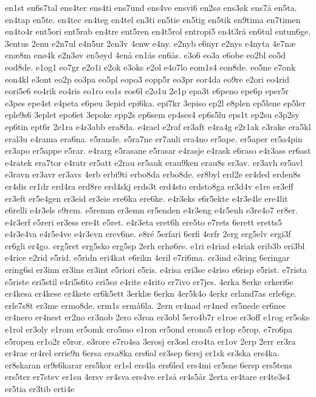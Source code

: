 en1st
en6s7tal
ens4ter
ens4ti
ens7und
ens4ve
ensvi6
en2s^^f8
ens3^^f8k
ens7^^e5
en5ta.
en4tap
en5te.
en4tec
en4teg
en4tel
en3ti
en5tie
en5tig
en5tik
en9tima
en7timen
en4to4r
ent5ori
ent5rab
en4tre
ent5ren
en4t5rol
entropi5
en4t3r^^e5
en6tul
entun6ge.
3entus
2enu
e2n7ul
e4n5ur
2en3v
4enw
e4ny.
e2nyb
e6nyr
e2nys
e4nyta
4e7n^^e6
en^^e68m
en^^f84k
e2n3^^f8v
en5^^f8yd
4en^^e5
en1^^e5s
en6^^e5s.
e3o6
eo3a
e6obe
eo2bl
eo5d
eod8de.
e1og1
eo7gr
e2o1i
e2ok
e3oks
e2ol
e4o7lo
eom1s4
eon8de.
eo5ne
e7onk
eon4kl
e3ont
eo2p
eo3pa
eo5pl
eopo3
eopp5r
eo3pr
eor4da
eo9re
e2ori
eo4rid
eori5e6
eo4rik
eo4ris
eo1ro
eo1s
eos6l
e2o1u
2e1p
epa3t
e6peno
epe6p
eper5r
e3pes
epe4st
e4peta
e6peu
3epid
epi6ka.
epi7kr
3episo
ep2l
e8plen
ep5lene
ep5ler
eple9s6
3eplet
epo6et
3epoke
epp2s
ep6sem
ep4ses4
ep6s5lu
eps1t
ep2su
e3p2sy
ep6tin
ept6r
2e1ra
e4r3abb
era8da.
e4rael
e2raf
er3aft
e4ra4g
e2r1ak
e3rake
era5kl
eral3u
e4rama
era6na.
e5rande.
e5ra7ne
er7anli
era4no
er5ape.
er5aper
er5a4pin
er3apo
er5appe
e5rar.
e4rarg
e5rasane
e5rasar
e4rasje
e4rask
e6raso
e4r3ass
er6ast
e4ratek
era7tor
e4ratr
er5att
e2rau
er5auk
erau9ken
erau8s
er3av.
er3avh
er5avl
e3ravn
er3avr
er3avs
4erb
erbi9ti
erbo8da
erbo8de.
er8byl
erd2e
er4ded
erden8s
er4dis
er1dr
erd4ra
erd8re
erd4skj
erds3t
erd4sto
erdsto8ga
er3d4v
e1re
er3eff
er3eft
er5e4gen
er3eid
er3eie
ere6ka
ere6ke.
e4r3eks
e6r5ekte
e4r3e4le
ere4lit
e6relli
e4r3els
e9rem.
e5remm
er3emn
er5enden
e4r3eng
e4r5enh
e3re4o7
er8er.
e4r3erf
e5reri
er3ess
ere4t
e5ret.
e4r3eta
eret6h
ere5to
e7rets
6erett
eretts5
e4r3e4va
e4r5e4ve
e4r3evn
erev6ne.
e8r^^e9
5erfari
6erfi
4erfr
2erg
erg5elv
ergi3f
er6gli
er4go.
erg5ret
erg5sko
erg5sp
2erh
erh^^f86re.
e1ri
e4riad
e4riak
erib3b
eri3bl
e4rice
e2rid
e5rid.
e5ridn
eri4kat
e6rikn
4eril
e7ri6ma.
er3ind
e3ring
6eringar
ering6si
er3inn
er3ins
er3int
e5riori
e5ris.
e4risa
eri3se
e4riso
e6risp
e5rist.
e7rista
e5riste
eri5stil
e4ri5s6to
eri5s^^f8
e4rite
e4rito
er7ivo
er7jes.
4erka
8erke
erkeri6e
er4kesa
er4kese
er4kete
er6k5ett
3erkl^^e6
6erkn
4er5k4o
4erkr
erland7as
erle6ge.
erle7s8t
er3me
ermo8de.
erm1s
erm^^e56la.
2ern
er4nad
er4ned
er5nede
er6nee
er4nero
er4nest
er2no
er3nob
2ero
e3roa
er3obl
5ero4b7r
e1roe
er3off
e1rog
er5oks
e1rol
er3oly
e1rom
er5omk
ero5mo
e1ron
er5ond
erono5
er1op
e5rop.
e7ro6pa
e5ropen
er1o2r
e5ror.
e3rore
e7ro4sa
3erosj
er3osl
ero4ta
er1ov
2erp
2err
er3ra
er4rae
er4rel
errie9n
6ersa
ersa8ka
ers6al
er3sep
6ersj
er1sk
er3ska
ers4ka.
er8skaran
er9s6karar
ers5kor
er1sl
ers4la
ers6led
ers4mi
er5sne
6ersp
ers5tens
ers5ter
er7stev
er1su
4ersv
er4sva
ers4ve
er1s^^e5
er4s5^^e5r
2erta
er4tare
er4te3s4
er5tia
er3tib
erti4e
